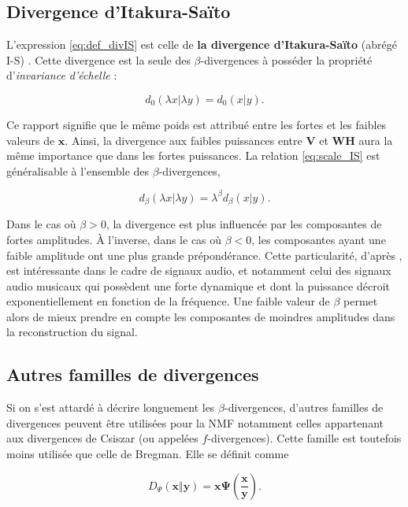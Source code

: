 \subsection{Divergence d'Itakura-Saïto}\label{part:div_IS}
L'expression \ref{eq:def_divIS} est celle de \textbf{la divergence d'Itakura-Saïto} (abrégé I-S) \cite{itakura1968analysis, bertin_les_2009}. Cette divergence est la seule des $\beta$-divergences à posséder la propriété d'\textit{invariance d'échelle} :

\begin{equation}\label{eq:scale_IS}
d_{0}(\lambda x \vert \lambda y) = d_{0}(x \vert y).
\end{equation}

Ce rapport signifie que le même poids est attribué entre les fortes et les faibles valeurs de $\mathbf{x}$. Ainsi, la divergence aux faibles puissances entre $\textbf{V}$ et $\textbf{WH}$ aura la même importance que dans les fortes puissances. La relation \ref{eq:scale_IS} est généralisable à l'ensemble des $\beta$-divergences,

\begin{equation}
d_{\beta}(\lambda x \vert \lambda y) = \lambda^{\beta}d_{\beta}(x \vert y).
\end{equation}


Dans le cas où $\beta > 0$, la divergence est plus influencée par les composantes de fortes amplitudes. À l'inverse, dans le cas où $\beta < 0$, les composantes ayant une faible amplitude ont une plus grande prépondérance. Cette particularité, d'après \cite{fevotte_nonnegative_2009}, est intéressante dans le cadre de signaux audio, et notamment celui des signaux audio musicaux qui possèdent une forte dynamique et dont la puissance décroit exponentiellement en fonction de la fréquence. Une faible valeur de $\beta$ permet alors de mieux prendre en compte les composantes de moindres amplitudes dans la reconstruction du signal.

\subsection{Autres familles de divergences}
Si on s'est attardé à décrire longuement les $\beta$-divergences, d'autres familles de divergences peuvent être utilisées pour la NMF notamment celles appartenant aux divergences de Csiszar (ou appelées $f$-divergences). Cette famille est toutefois moins utilisée que celle de Bregman. Elle se définit comme

\begin{equation}
D_{\Psi} (\mathbf{x} \Vert\mathbf{y}) = \mathbf{x} \mathbf{\Psi} \left( \frac{\mathbf{x}}{\mathbf{y}}\right).
\end{equation}


